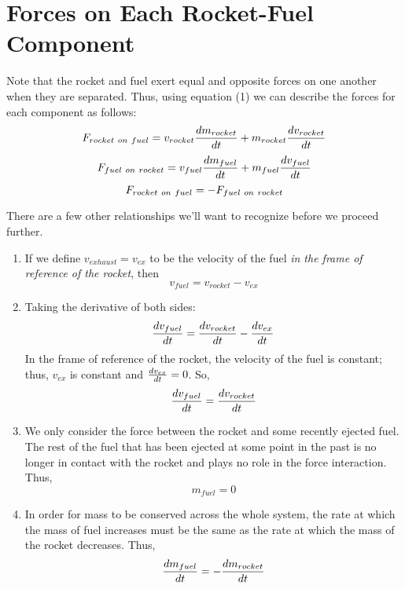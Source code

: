 \documentclass{article}
\begin{document}
\section{Forces on Each Rocket-Fuel Component}
Note that the rocket and fuel exert equal and opposite forces on one another when they are separated. Thus, using equation (1) we can describe the forces for each component as follows:
\begin{equation}
F_{rocket\ on\ fuel} = v_{rocket} \frac{dm_{rocket}}{dt} + m_{rocket}  \frac{dv_{rocket}}{dt}
\end{equation}
\begin{equation}
F_{fuel\ on\ rocket}= v_{fuel} \frac{dm_{fuel}}{dt} + m_{fuel}  \frac{dv_{fuel}}{dt}
\end{equation}
\begin{equation}
F_{rocket\ on\ fuel} = -F_{fuel\ on\ rocket}
\end{equation}

There are a few other relationships we'll want to recognize before we proceed further. 
\begin{enumerate}
\item If we define $v_{exhaust} = v_{ex}$ to be the velocity of the fuel \textit{in the frame of reference of the rocket}, then
\begin{equation}
v_{fuel} = v_{rocket} - v_{ex}
\end{equation}
\item Taking the derivative of both sides:
$$\frac{dv_{fuel}}{dt} = \frac{dv_{rocket}}{dt} - \frac{dv_{ex}}{dt}$$
In the frame of reference of the rocket, the velocity of the fuel is constant; thus, $v_{ex}$ is constant and $\frac{dv_{ex}}{dt} = 0$. So,
\begin{equation}
\frac{dv_{fuel}}{dt} = \frac{dv_{rocket}}{dt}
\end{equation}
\item We only consider the force between the rocket and some recently ejected fuel. The rest of the fuel that has been ejected at some point in the past is no longer in contact with the rocket and plays no role in the force interaction. Thus, 
\begin{equation}
m_{fuel} = 0
\end{equation}
\item In order for mass to be conserved across the whole system, the rate at which the mass of fuel increases must be the same as the rate at which the mass of the rocket decreases. Thus, 
\begin{equation}
\frac{dm_{fuel}}{dt} = - \frac{dm_{rocket}}{dt}
\end{equation}

\end{enumerate}
\end{document}
